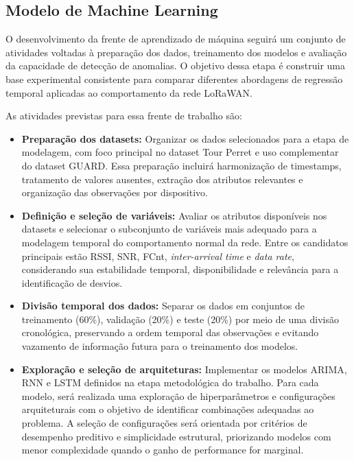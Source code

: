\subsection{Modelo de Machine Learning}

O desenvolvimento da frente de aprendizado de máquina seguirá um conjunto de
atividades voltadas à preparação dos dados, treinamento dos modelos e avaliação
da capacidade de detecção de anomalias. O objetivo dessa etapa é construir uma
base experimental consistente para comparar diferentes abordagens de regressão
temporal aplicadas ao comportamento da rede LoRaWAN.

As atividades previstas para essa frente de trabalho são:
\begin{itemize}
    \item \textbf{Preparação dos datasets:} Organizar os dados selecionados para a etapa de modelagem, com foco principal no dataset Tour Perret e uso complementar do dataset GUARD. Essa preparação incluirá harmonização de timestamps, tratamento de valores ausentes, extração dos atributos relevantes e organização das observações por dispositivo.

    \item \textbf{Definição e seleção de variáveis:} Avaliar os atributos disponíveis nos datasets e selecionar o subconjunto de variáveis mais adequado para a modelagem temporal do comportamento normal da rede. Entre os candidatos principais estão RSSI, SNR, FCnt, \textit{inter-arrival time} e \textit{data rate}, considerando sua estabilidade temporal, disponibilidade e relevância para a identificação de desvios.

    \item \textbf{Divisão temporal dos dados:} Separar os dados em conjuntos de treinamento (60\%), validação (20\%) e teste (20\%) por meio de uma divisão cronológica, preservando a ordem temporal das observações e evitando vazamento de informação futura para o treinamento dos modelos.

    \item \textbf{Exploração e seleção de arquiteturas:} Implementar os modelos ARIMA, RNN e LSTM definidos na etapa metodológica do trabalho. Para cada modelo, será realizada uma exploração de hiperparâmetros e configurações arquiteturais com o objetivo de identificar combinações adequadas ao problema. A seleção de configurações será orientada por critérios de desempenho preditivo e simplicidade estrutural, priorizando modelos com menor complexidade quando o ganho de performance for marginal.


\end{itemize}
